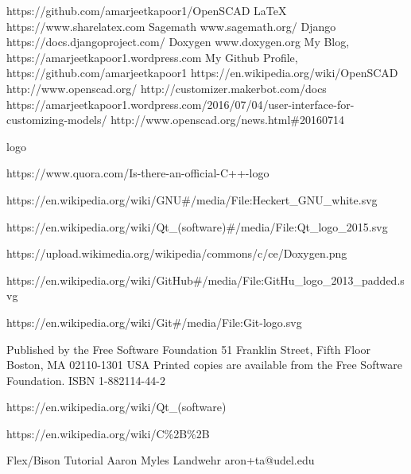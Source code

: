 \begin{thebibliography}{22}
\bibitem{}  https://github.com/amarjeetkapoor1/OpenSCAD
\bibitem{} \LaTeX{} https://www.sharelatex.com
\bibitem{} Sagemath www.sagemath.org/
\bibitem{} Django https://docs.djangoproject.com/
\bibitem{} Doxygen www.doxygen.org
\bibitem{} My Blog, https://amarjeetkapoor1.wordpress.com
\bibitem{} My Github Profile, https://github.com/amarjeetkapoor1
\bibitem{} https://en.wikipedia.org/wiki/OpenSCAD
\bibitem{} http://www.openscad.org/
\bibitem{} http://customizer.makerbot.com/docs
\bibitem{} https://amarjeetkapoor1.wordpress.com/2016/07/04/user-interface-for-customizing-models/
\bibitem{} http://www.openscad.org/news.html\#20160714


logo

\bibitem{} https://www.quora.com/Is-there-an-official-C++-logo

\bibitem{} https://en.wikipedia.org/wiki/GNU\#/media/File:Heckert\_GNU\_white.svg

\bibitem{} https://en.wikipedia.org/wiki/Qt\_(software)\#/media/File:Qt\_logo\_2015.svg


\bibitem{} https://upload.wikimedia.org/wikipedia/commons/c/ce/Doxygen.png

\bibitem{} https://en.wikipedia.org/wiki/GitHub\#/media/File:GitHu\_logo\_2013\_padded.svg

\bibitem{} https://en.wikipedia.org/wiki/Git\#/media/File:Git-logo.svg

\bibitem{}
Published by the Free Software Foundation
51 Franklin Street, Fifth Floor
Boston, MA 02110-1301 USA
Printed copies are available from the Free Software Foundation.
ISBN 1-882114-44-2

\bibitem{} https://en.wikipedia.org/wiki/Qt\_(software)

\bibitem{} https://en.wikipedia.org/wiki/C\%2B\%2B

\bibitem{} Flex/Bison Tutorial
Aaron Myles Landwehr
aron+ta@udel.edu

\end{thebibliography}
